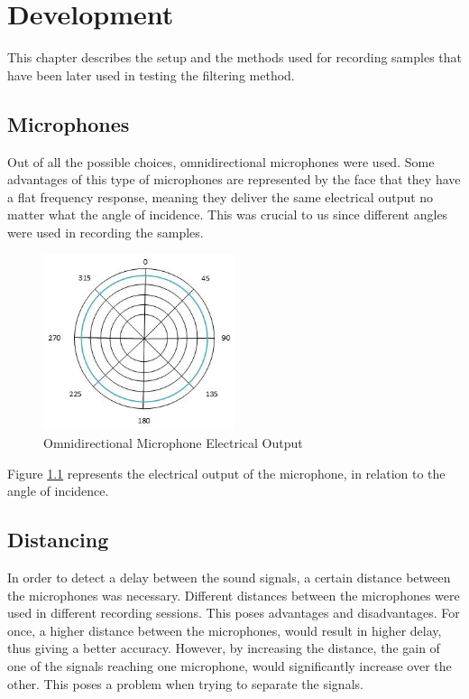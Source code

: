 \chapter{Development}\label{ch:development}
This chapter describes the setup and the methods used for recording samples that have been later used
in testing the filtering method.
\section{Microphones}
Out of all the possible choices, omnidirectional microphones were used. Some advantages of this 
type of microphones are represented by the face that they have a flat frequency response, meaning 
they deliver the same electrical output no matter what the angle of incidence. This was crucial to us
since different angles were used in recording the samples.

\begin{figure}[htp]
	\centering
	\includegraphics[width=0.5\textwidth]{Illustrations/omnidirectional.jpg}
	\caption{Omnidirectional Microphone Electrical Output}
	\label{fig:omniMic}
\end{figure}
Figure \ref{fig:omniMic} represents the electrical output of the microphone, in relation to the angle of
incidence.
\newpage
\section{Distancing}
In order to detect a delay between the sound signals, a certain distance between the microphones was
necessary. Different distances between the microphones were used in different recording sessions.
This poses advantages and disadvantages.
For once, a higher distance between the microphones,
would result in higher delay, thus giving a better accuracy. However, by increasing the distance,
the gain of one of the signals reaching one microphone, would significantly increase over the other. 
This poses a problem when trying to separate the signals.
